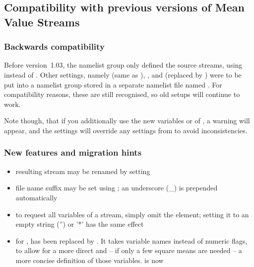 \begin{appendix}
\begin{enumerate}
\end{enumerate} %




\subsection{Compatibility with previous versions of Mean Value Streams}

\subsubsection{Backwards compatibility}

Before \echam{} version~1.03, the namelist group  only defined
the source streams, using  instead of .
Other settings, namely  (same as ),
, and  (replaced by )
were to be put into a namelist group  stored in a separate
namelist file named
.
For compatibility reasons, these are still recognised,
so old setups will continue to work.

Note though, that if you additionally use the new variables 
or  of , a warning will appear,
and the   settings will override any settings from
 to avoid inconsistencies.

\subsubsection{New features and migration hints}

\begin{itemize}
\item resulting stream may be renamed by setting 
\item file name suffix may be set using ;
      an underscore (\_) is prepended automatically
\item to request all variables of a stream, simply omit the
   element; 
      setting it to an empty string ('') or '*' has the same effect
\item for , 
       has been replaced by .
      It takes variable names instead of numeric flags,
      to allow for a more direct and -- if only a few square means are needed --
      a more concise definition of those variables.
       is now 
\end{itemize}


\end{appendix}
